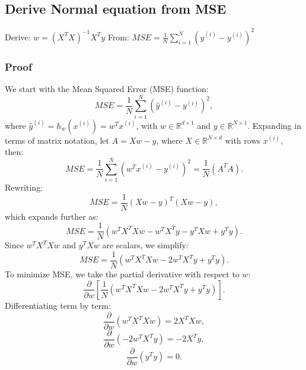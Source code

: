 \documentclass{article}
\begin{document}
\subsection*{Derive Normal equation from MSE}
\noindent Derive:
  $w = (X^T X)^{-1} X^T y$
From:
   $ MSE = \frac{1}{N} \sum_{i=1}^{N}(\hat{y}^{(i)} - y^{(i)})^2 $

\subsubsection*{Proof}
We start with the Mean Squared Error (MSE) function:
\begin{equation}
    MSE = \frac{1}{N} \sum_{i=1}^{N} (\hat{y}^{(i)} - y^{(i)})^2,
\end{equation}
where \( \hat{y}^{(i)} = h_w(x^{(i)}) = w^T x^{(i)} \), with \( w \in \mathbb{R}^{d \times 1} \) and \( y \in \mathbb{R}^{N \times 1} \).
Expanding in terms of matrix notation, let \( A = Xw - y \), where \( X \in \mathbb{R}^{N \times d} \) with rows \( x^{(i)} \), then:
\begin{equation}
    MSE = \frac{1}{N} \sum_{i=1}^{N} (w^T x^{(i)} - y^{(i)})^2 = \frac{1}{N} (A^T A).
\end{equation}
Rewriting:
\begin{equation}
    MSE = \frac{1}{N} (Xw - y)^T (Xw - y),
\end{equation}
which expands further as:
\begin{equation}
    MSE = \frac{1}{N} \left( w^T X^T X w - w^T X^T y - y^T X w + y^T y \right).
\end{equation}
Since \( w^T X^T X w \) and \( y^T X w \) are scalars, we simplify:
\begin{equation}
    MSE = \frac{1}{N} \left( w^T X^T X w - 2 w^T X^T y + y^T y \right).
\end{equation}
To minimize MSE, we take the partial derivative with respect to \( w \):
\begin{equation}
    \frac{\partial}{\partial w} \left[ \frac{1}{N} \left( w^T X^T X w - 2 w^T X^T y + y^T y \right) \right].
\end{equation}
Differentiating term by term:
\begin{equation}
    \frac{\partial}{\partial w} (w^T X^T X w) = 2X^T X w,
\end{equation}
\begin{equation}
    \frac{\partial}{\partial w} (-2 w^T X^T y) = -2 X^T y,
\end{equation}
\begin{equation}
    \frac{\partial}{\partial w} (y^T y) = 0.
\end{equation}
\end{document}

